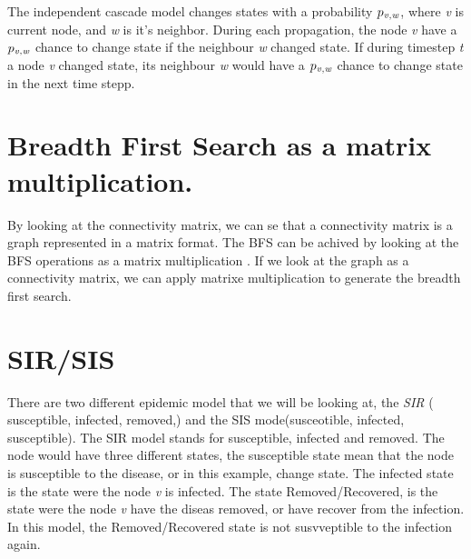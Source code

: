 The independent cascade model changes states with a probability $p_{\it v, w}$, where {\it v }is current node, and {\it w} is it's neighbor. During each propagation, the node {\it v} have a  $p_{\it v, w}$ chance to change state if the neighbour {\it w} changed state. If during timestep {\it t} a node {\it v} changed state, its neighbour {\it w} would have a  $p_{\it v, w}$ chance to change state in the next time stepp. 

\section{Breadth First Search as a matrix multiplication.}
By looking at the 	connectivity matrix, we can se that a connectivity matrix is a graph represented in a matrix format. The BFS can be achived by looking at the BFS operations as a matrix multiplication \cite{algoToMath}. If we look at the graph as a connectivity matrix, we can apply matrixe multiplication to generate the breadth first search. 

\section{SIR/SIS}
There are two different epidemic model that we will be looking at, the {\it SIR} ( susceptible, infected, removed,) and the SIS mode(susceotible, infected, susceptible). The SIR model stands for susceptible, infected and removed. The node would have three different states, the susceptible state mean that the node is susceptible to the disease, or in this example, change state. The infected state is the state were the node {\it v} is infected. The state Removed/Recovered, is the state were the node {\it v} have the diseas removed, or have recover from the infection. In this model, the Removed/Recovered state is not susvveptible to the infection again. 